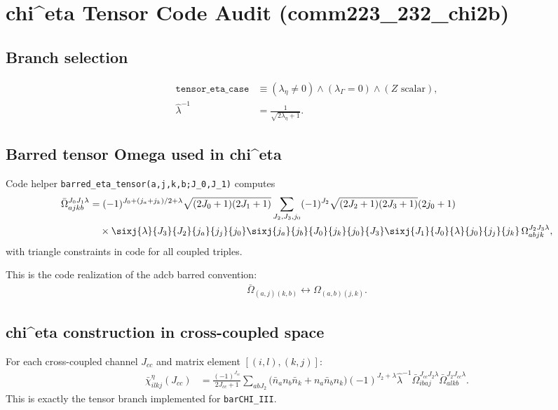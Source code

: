 
\section*{chi^eta Tensor Code Audit (comm223\_232\_chi2b)}

\subsection*{Branch selection}
\begin{align}
\texttt{tensor\_eta\_case}
&\equiv (\lambda_\eta \neq 0)\wedge(\lambda_\Gamma = 0)\wedge(Z\text{ scalar}), \\
\hat\lambda^{-1} &= \frac{1}{\sqrt{2\lambda_\eta+1}}.
\end{align}

\subsection*{Barred tensor Omega used in chi^eta}
Code helper \texttt{barred\_eta\_tensor(a,j,k,b;J_0,J_1)} computes
\begin{align}
\bar\Omega_{a j k b}^{J_0 J_1 \lambda}
&= (-1)^{J_0 + (j_a+j_k)/2 + \lambda}
\sqrt{(2J_0+1)(2J_1+1)}
\sum_{J_2,J_3,j_0}
(-1)^{J_2}
\sqrt{(2J_2+1)(2J_3+1)}(2j_0+1) \\
&\quad \times
\sixj{\lambda}{J_3}{J_2}{j_a}{j_j}{j_0}
\sixj{j_a}{j_b}{J_0}{j_k}{j_0}{J_3}
\sixj{J_1}{J_0}{\lambda}{j_0}{j_j}{j_k}
\,\Omega_{a b j k}^{J_2 J_3 \lambda},
\end{align}
with triangle constraints in code for all coupled triples.

This is the code realization of the adcb barred convention:
\begin{align}
\bar\Omega_{(a,j)(k,b)}\leftrightarrow \Omega_{(a,b)(j,k)}.
\end{align}

\subsection*{chi^eta construction in cross-coupled space}
For each cross-coupled channel $J_{cc}$ and matrix element $[(i,l),(k,j)]$:
\begin{align}
\bar\chi^{\eta}_{i l k j}(J_{cc})
&= \frac{(-1)^{J_{cc}}}{2J_{cc}+1}
\sum_{a b J_2}
\Big(\bar n_a n_b \bar n_k + n_a \bar n_b n_k\Big)
(-1)^{J_2+\lambda}\hat\lambda^{-1}
\bar\Omega_{i b a j}^{J_{cc} J_2 \lambda}
\bar\Omega_{a l k b}^{J_2 J_{cc} \lambda}.
\end{align}
This is exactly the tensor branch implemented for \texttt{barCHI\_III}.


